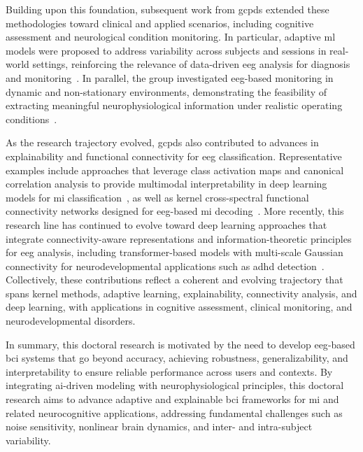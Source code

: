 Building upon this foundation, subsequent work from \gls{gcpds} extended these methodologies toward clinical and applied scenarios, including cognitive assessment and neurological condition monitoring. In particular, adaptive \gls{ml} models were proposed to address variability across subjects and sessions in real-world settings, reinforcing the relevance of data-driven \gls{eeg} analysis for diagnosis and monitoring~\cite{Collazos2019Alzheimer,Collazos2019Instance}. In parallel, the group investigated \gls{eeg}-based monitoring in dynamic and non-stationary environments, demonstrating the feasibility of extracting meaningful neurophysiological information under realistic operating conditions~\cite{Pulgarin2017Kinematic}.

As the research trajectory evolved, \gls{gcpds} also contributed to advances in explainability and functional connectivity for \gls{eeg} classification. Representative examples include approaches that leverage class activation maps and canonical correlation analysis to provide multimodal interpretability in deep learning models for \gls{mi} classification~\cite{loaiza2024multimodal}, as well as kernel cross-spectral functional connectivity networks designed for \gls{eeg}-based \gls{mi} decoding~\cite{garcia2023kcsfcnet}. More recently, this research line has continued to evolve toward deep learning approaches that integrate connectivity-aware representations and information-theoretic principles for \gls{eeg} analysis, including transformer-based models with multi-scale Gaussian connectivity for neurodevelopmental applications such as \gls{adhd} detection~\cite{salazar2025tgar}. Collectively, these contributions reflect a coherent and evolving trajectory that spans kernel methods, adaptive learning, explainability, connectivity analysis, and deep learning, with applications in cognitive assessment, clinical monitoring, and neurodevelopmental disorders.

In summary, this doctoral research is motivated by the need to develop \gls{eeg}-based \gls{bci} systems that go beyond accuracy, achieving robustness, generalizability, and interpretability to ensure reliable performance across users and contexts. By integrating \gls{ai}-driven modeling with neurophysiological principles, {this doctoral research} aims to advance adaptive and explainable \gls{bci} frameworks for \gls{mi} and related neurocognitive applications, addressing fundamental challenges such as noise sensitivity, nonlinear brain dynamics, and inter- and intra-subject variability.

